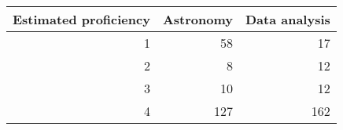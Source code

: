 \begin{tabular}{rrr}
\toprule
 Estimated proficiency &  Astronomy &  Data analysis \\
\midrule
                     1 &         58 &             17 \\
                     2 &          8 &             12 \\
                     3 &         10 &             12 \\
                     4 &        127 &            162 \\
\bottomrule
\end{tabular}
